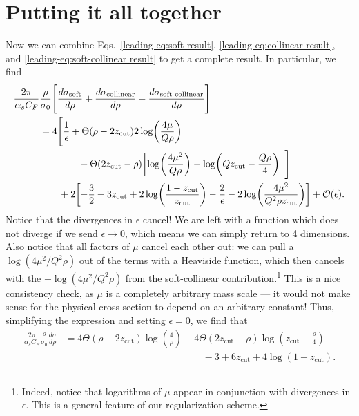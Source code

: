 \documentclass[../thesis.tex]{subfiles}
\providecommand{\zcut}{z_\mathrm{{cut}}}
\providecommand{\cO}{\mathcal{O}}
\begin{document}
\section{Putting it all together}
	Now we can combine Eqs.~\ref{leading-eq:soft result}, \ref{leading-eq:collinear result}, and \ref{leading-eq:soft-collinear result} to get a complete result. In particular, we find
	\begin{equation}
	\begin{aligned}
		\frac{2\pi}{\alpha_s C_F}&\frac{\rho}{\sigma_0}\Bigg[\frac{d\sigma_{\text{soft}}}{d\rho} + \frac{d\sigma_{\text{collinear}}}{d\rho} - \frac{d\sigma_{\text{soft-collinear}}}{d\rho}\Bigg] \\
		&= 4 \Bigg[\frac{1}{\epsilon} + \Theta(\rho - 2\zcut)2\log(\frac{4\mu}{Q\rho}) \\
			&\qquad\qquad+ \Theta(2\zcut - \rho)\qty[\log(\frac{4\mu^2}{Q \rho}) - \log(Q \zcut - \frac{Q\rho}{4})]\Bigg] \\
			&\qquad + 2\qty[-\frac{3}{2} + 3 \zcut + 2 \log(\frac{1-\zcut}{\zcut}) - \frac{2}{\epsilon} - 2\log(\frac{4\mu^2}{Q^2 \rho \zcut})] + \cO(\epsilon).
	\end{aligned}
	\end{equation}
	Notice that the divergences in $\epsilon$ cancel! We are left with a function which does not diverge if we send $\epsilon \to 0$, which means we can simply return to 4 dimensions. Also notice that all factors of $\mu$ cancel each other out: we can pull a $\log(4\mu^2/Q^2\rho)$ out of the terms with a Heaviside function, which then cancels with the $-\log(4\mu^2/Q^2\rho)$ from the soft-collinear contribution.\footnote{Indeed, notice that logarithms of $\mu$ appear in conjunction with divergences in $\epsilon$. This is a general feature of our regularization scheme.} This is a nice consistency check, as $\mu$ is a completely arbitrary mass scale --- it would not make sense for the physical cross section to depend on an arbitrary constant! Thus, simplifying the expression and setting $\epsilon = 0$, we find that
	\begin{equation}\label{leading-eq:fixed order result}
	\boxed{
	\begin{aligned}
		\frac{2\pi}{\alpha_s C_F}\frac{\rho}{\sigma_0}\frac{d\sigma}{d\rho} &= 4\Theta(\rho - 2\zcut)\log(\frac{4}{\rho}) - 4\Theta(2\zcut - \rho)\log(\zcut - \frac{\rho}{4}) \\
		&\hspace{6cm} - 3 + 6\zcut + 4\log(1-\zcut).
	\end{aligned}
	}
	\end{equation}
\end{document}
